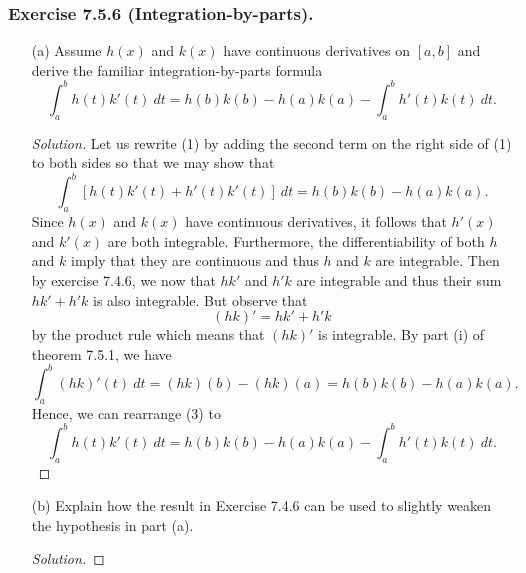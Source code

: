 \subsubsection{Exercise 7.5.6 (Integration-by-parts).} 
\begin{enumerate}
	\item[(a)] Assume \( h(x)  \) and \( k(x)  \) have continuous derivatives on \( [a,b]  \) and derive the familiar integration-by-parts formula 
		\[  \int_{ a }^{ b } h(t)k'(t) \   dt = h(b)k(b) - h(a)k(a) - \int_{ a }^{ b } h'(t)k(t) \    dt. \tag{1} \]
		\begin{proof}[Solution]
		Let us rewrite (1) by adding the second term on the right side of (1) to both sides so that we may show that 
		\[  \int_{ a }^{ b } [h(t)k'(t) + h'(t)k'(t)] \    dt = h(b)k(b) - h(a)k(a) \tag{2}. \]
	Since \( h(x)  \) and \( k(x)  \) have continuous derivatives, it follows that \( h'(x)  \) and \( k'(x)  \) are both integrable. Furthermore, the differentiability of both \( h  \) and \( k  \) imply that they are continuous and thus \( h \) and \( k  \) are integrable. Then by exercise 7.4.6, we now that \( h k'  \) and \( h'k  \) are integrable and thus their sum \( hk' + h'k  \) is also integrable. But observe that 
	\[  (hk)' = hk' + h'k  \]
	by the product rule which means that \( (hk)' \) is integrable. By part (i) of theorem 7.5.1, we have 
	\[  \int_{ a }^{ b } (hk)'(t) \ dt = (hk)(b) - (hk)(a) = h(b)k(b) - h(a)k(a) \tag{3}. \]
	Hence, we can rearrange (3) to 
	\[  \int_{ a }^{ b } h(t)k'(t) \   dt = h(b)k(b) - h(a)k(a) - \int_{ a }^{ b } h'(t)k(t) \    dt. \]
		\end{proof}
	\item[(b)] Explain how the result in Exercise 7.4.6 can be used to slightly weaken the hypothesis in part (a).
		\begin{proof}[Solution]
		
		\end{proof}
\end{enumerate}
 
